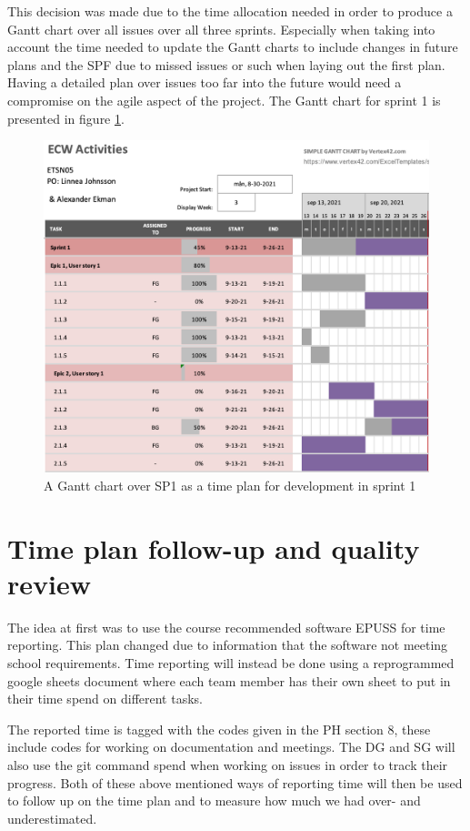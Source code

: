 \documentclass{article}
\begin{document}
This decision was made due to the time allocation needed in order to produce a Gantt chart over all issues over all three sprints. Especially when taking into account the time needed to update the Gantt charts to include changes in future plans and the SPF due to missed issues or such when laying out the first plan. Having a detailed plan over issues too far into the future would need a compromise on the agile aspect of the project. The Gantt chart for sprint 1 is presented in figure \ref{fig:GantDev}. 
\begin{figure}[h!]
    \centering
    \includegraphics[scale=0.75]{sdpFigures/GanttDevV2.png}
    \caption{A Gantt chart over SP1 as a time plan for development in sprint 1}
    \label{fig:GantDev}
\end{figure}

\section{Time plan follow-up and quality review}
The idea at first was to use the course recommended software EPUSS for time reporting. This plan changed due to information that the software not meeting school requirements. Time reporting will instead be done using a reprogrammed google sheets document where each team member has their own sheet to put in their time spend on different tasks. 

The reported time is tagged with the codes given in the PH section 8, these include codes for working on documentation and meetings. The DG and SG will also use the git command spend when working on issues in order to track their progress. Both of these above mentioned ways of reporting time will then be used to follow up on the time plan and to measure how much we had over- and underestimated.
\end{document}
